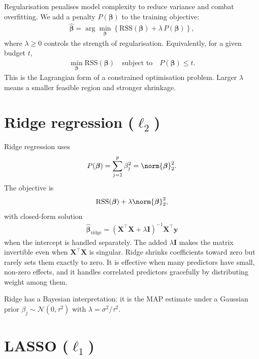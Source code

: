 \documentclass[a4paper, 12pt]{book}
\begin{document}
Regularisation penalises model complexity to reduce variance and combat overfitting.
We add a penalty $P(\boldsymbol{\beta})$ to the training objective:
\begin{align}
    \hat{\boldsymbol{\beta}}
    = \arg\min_{\boldsymbol{\beta}}
      \left\{ \mathrm{RSS}(\boldsymbol{\beta})
      + \lambda\,P(\boldsymbol{\beta}) \right\},
\end{align}
where $\lambda \geq 0$ controls the strength of regularisation. Equivalently, for a
given budget $t$,
\begin{align}
    \min_{\boldsymbol{\beta}} \mathrm{RSS}(\boldsymbol{\beta})
    \quad \text{subject to} \quad P(\boldsymbol{\beta}) \leq t.
\end{align}
This is the Lagrangian form of a constrained optimisation problem. Larger $\lambda$
means a smaller feasible region and stronger shrinkage.

\section{Ridge regression ($\ell_2$)}

Ridge regression uses
\begin{align}
    P(\boldsymbol{\beta}) = \sum_{j=1}^p \beta_j^2 = \norm{\boldsymbol{\beta}}_2^2.
\end{align}
The objective is
\begin{align}
    \mathrm{RSS}(\boldsymbol{\beta}) + \lambda\norm{\boldsymbol{\beta}}_2^2,
\end{align}
with closed-form solution
\begin{align}
    \hat{\boldsymbol{\beta}}_{\mathrm{ridge}}
    = (\mathbf{X}^\top\mathbf{X} + \lambda\mathbf{I})^{-1}\mathbf{X}^\top\mathbf{y}
\end{align}
when the intercept is handled separately. The added $\lambda\mathbf{I}$ makes the
matrix invertible even when $\mathbf{X}^\top\mathbf{X}$ is singular. Ridge shrinks
coefficients toward zero but rarely sets them exactly to zero. It is effective when
many predictors have small, non-zero effects, and it handles correlated predictors
gracefully by distributing weight among them.

Ridge has a Bayesian interpretation: it is the MAP estimate under a Gaussian prior
$\beta_j \sim \mathcal{N}(0,\tau^2)$ with $\lambda = \sigma^2/\tau^2$.

\section{LASSO ($\ell_1$)}
\end{document}
